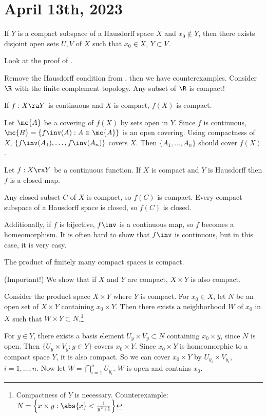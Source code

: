 \section*{April 13th, 2023}

 If \(Y\) is a compact subspace of a Hausdorff space \(X\) and \(x_0 \notin Y\), then there exists disjoint open sets \(U, V\) of \(X\) such that \(x_0 \in X\), \(Y \subset V\).

\pf Look at the proof of .

Remove the Hausdorff condition from , then we have counterexamples. Consider \(\R\) with the finite complement topology. Any subset of \(\R\) is compact!

 If \(f : X \ra Y\) is continuous and \(X\) is compact, \(f(X)\) is compact.

\pf Let \(\mc{A}\) be a covering of \(f(X)\) by sets open in \(Y\). Since \(f\) is continuous, \(\mc{B} = \{f\inv(A) : A \in \mc{A}\}\) is an open covering. Using compactness of \(X\), \(\{f\inv(A_1), \dots, f\inv(A_n)\}\) covers \(X\). Then \(\{A_1, \dots, A_n\}\) should cover \(f(X)\).

 Let \(f : X \ra Y\) be a continuous function. If \(X\) is compact and \(Y\) is Hausdorff then \(f\) is a closed map.

\pf Any closed subset \(C\) of \(X\) is compact, so \(f(C)\) is compact. Every compact subspace of a Hausdorff space is closed, so \(f(C)\) is closed.

\rmk Additionally, if \(f\) is bijective, \(f\inv\) is a continuous map, so \(f\) becomes a homeomorphism. It is often hard to show that \(f\inv\) is continuous, but in this case, it is very easy.

 The product of finitely many compact spaces is compact.

\pf (Important!) We show that if \(X\) and \(Y\) are compact, \(X \times Y\) is also compact.

  Consider the product space \(X \times Y\) where \(Y\) is compact. For \(x_0 \in X\), let \(N\) be an open set of \(X \times Y\) containing \(x_0 \times Y\). Then there exists a neighborhood \(W\) of \(x_0\) in \(X\) such that \(W \times Y \subset N\).\footnote{Compactness of \(Y\) is necessary. Counterexample: \(N = \left\{x\times y : \abs{x} < \frac{1}{y^2 + 1}\right\}\)}

\pf For \(y \in Y\), there exists a basis element \(U_y \times V_y \subset N\) containing \(x_0 \times y\), since \(N\) is open. Then \(\{U_y\times V_y : y \in Y\}\) covers \(x_0 \times Y\). Since \(x_0 \times Y\) is homeomorphic to a compact space \(Y\), it is also compact. So we can cover \(x_0 \times Y\) by \(U_{y_i} \times V_{y_i}\), \(i = 1, \dots, n\). Now let \(W = \bigcap_{i=1}^n U_{y_i}\). \(W\) is open and contains \(x_0\).

